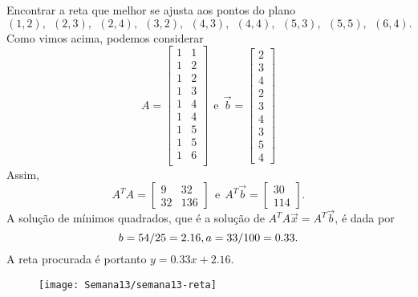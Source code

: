 \begin{ex}
  Encontrar a reta que melhor se ajusta aos pontos do plano
  \begin{equation}
  (1,2), \ \ (2,3), \ \ (2,4), \ \ (3,2), \ \ (4,3), \ \ (4,4), \ \ (5,3), \ \ (5,5), \ \ (6,4).
  \end{equation} Como vimos acima, podemos considerar
  \begin{equation}
  A =
  \begin{bmatrix}
    1 & 1 \\
    1 & 2 \\
    1 & 2 \\
    1 & 3 \\
    1 & 4 \\
    1 & 4 \\
    1 & 5 \\
    1 & 5 \\
    1 & 6 \\
  \end{bmatrix} \ \ \text{e} \ \
  \vec{b} =
  \begin{bmatrix}
    2\\3\\4\\2\\3\\4\\3\\5\\4
  \end{bmatrix}
  \end{equation} Assim,
  \begin{equation}
  A^T A =
  \begin{bmatrix}
    9  & 32  \\
    32  & 136
  \end{bmatrix}  \ \ \text{e} \ \
  A^T \vec{b} =
  \begin{bmatrix}
    30\\114
  \end{bmatrix}.
  \end{equation} A solução de mínimos quadrados, que é a solução de $A^T A \vec{x} = A^T\vec{b}$, é dada por
  \begin{equation}
  b = 54/25 = 2.16, \\ a = 33/100 = 0.33.
  \end{equation} A reta procurada é portanto $y = 0.33 x + 2.16$.
  \begin{figure}[h!]
    \begin{center}
      \texttt{[image: Semana13/semana13-reta]}
    \end{center}
  \end{figure}
\end{ex}


